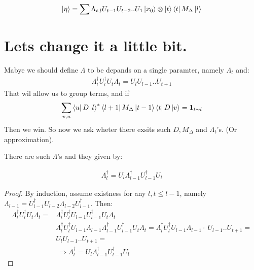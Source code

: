 \documentclass[manuscript,screen,review]{acmart}
\begin{document}
\begin{equation*}
  \begin{split}
    \ket{\eta} =  \sum \Lambda_{t,l}U_{t-1}U_{t-2}..U_{1}   \ket{x_{0}} \otimes  \ket{t} \bra{t} M_{\Delta} \ket{l}
  \end{split}
\end{equation*}


\section{Lets change it a little bit.}
Mabye we should define $\Lambda$ to be depands on a single paramter, namely $\Lambda_{t}$ and: 
\begin{equation*}
   \begin{split}
     \Lambda^{\dagger}_{l} U_{l}^{\dagger}U_{t} \Lambda_{t} = U_{l}U_{l-1}..U_{t+1}
   \end{split}
 \end{equation*}
 That wil allow us to group terms, and if 
\begin{equation*}
  \begin{split}
     \sum_{v,u}\bra{u}D\ket{l}^{*}\bra{l+1}M_{\Delta}\ket{t-1} \bra{t} D\ket{v} = \mathbf{1}_{ t \sim l } %
  \end{split}
\end{equation*}
Then we win. So now we ask wheter there exsits such $D,M_{\Delta}$ and $\Lambda_{t}$'s. (Or approximation).   
\begin{claim}
  There are such $\Lambda$'s and they given by: 
  
  \begin{equation*}
    \begin{split}
      \Lambda_{l}^{\dagger} = U_{l}\Lambda_{l-1}^{\dagger}U_{l-1}^{\dagger}U_{l}
    \end{split}
  \end{equation*}
\end{claim}
\begin{proof}
  By induction, assume existness for any  $l,t \le l-1$, namely $\Lambda_{l-1}= U_{l-1}^{\dagger}U_{l-2}\Lambda_{l-2}U^{\dagger}_{l-1}$. Then:  
\begin{equation*}
    \begin{split} 
      \Lambda^{\dagger}_{l} U_{l}^{\dagger}U_{t} \Lambda_{t} = &   \Lambda^{\dagger}_{l} U_{l}^{\dagger}U_{l-1}U_{l-1}^{\dagger}U_{t} \Lambda_{t} \\ 
      & \Lambda^{\dagger}_{l} U_{l}^{\dagger}U_{l-1}\Lambda_{l-1}\Lambda^{\dagger}_{l-1}U_{l-1}^{\dagger}U_{t} \Lambda_{t} = \Lambda^{\dagger}_{l} U_{l}^{\dagger}U_{l-1}\Lambda_{l-1} \cdot \ U_{l-1}..U_{t+1}  = \\ 
      & U_{l}U_{l-1}..U_{t+1} = \\ 
      & \ \Rightarrow   \Lambda_{l}^{\dagger} = U_{l}\Lambda_{l-1}^{\dagger}U_{l-1}^{\dagger}U_{l}
    \end{split}
  \end{equation*}
\end{proof}
\end{document}
